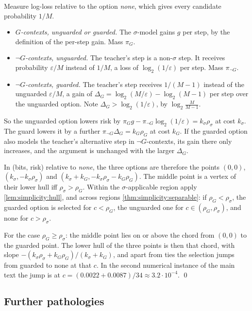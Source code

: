 Measure log-loss relative to the option \emph{none}, which gives every candidate probability $1/M$.
\begin{itemize}
\item \emph{$G$-contexts, unguarded or guarded.} The $\sigma$-model gains $g$ per step, by the definition of the per-step gain. Mass $\pi_G$.
\item \emph{$\neg G$-contexts, unguarded.} The teacher's step is a non-$\sigma$ step. It receives probability $\varepsilon/M$ instead of $1/M$, a loss of $\log_2(1/\varepsilon)$ per step. Mass $\pi_{\neg G}$.
\item \emph{$\neg G$-contexts, guarded.} The teacher's step receives $1/(M-1)$ instead of the unguarded $\varepsilon/M$, a gain of $\Delta_G=\log_2(M/\varepsilon)-\log_2(M-1)$ per step over the unguarded option. Note $\Delta_G>\log_2(1/\varepsilon)$, by $\log_2\frac M{M-1}$.
\end{itemize}
So the unguarded option lowers risk by $\pi_Gg-\pi_{\neg G}\log_2(1/\varepsilon)=k_\sigma\rho_\sigma$ at cost $k_\sigma$. The guard lowers it by a further $\pi_{\neg G}\Delta_G=k_G\rho_G$ at cost $k_G$. If the guarded option also models the teacher's alternative step in $\neg G$-contexts, its gain there only increases, and the argument is unchanged with the larger $\Delta_G$.

In (bits, risk) relative to \emph{none}, the three options are therefore the points $(0,0)$, $(k_\sigma,-k_\sigma\rho_\sigma)$ and $(k_\sigma+k_G,-k_\sigma\rho_\sigma-k_G\rho_G)$. The middle point is a vertex of their lower hull iff $\rho_\sigma>\rho_G$. Within the $\sigma$-applicable region apply \cref{lem:simplicity:hull}, and across regions \cref{thm:simplicity:separable}: if $\rho_G<\rho_\sigma$, the guarded option is selected for $c<\rho_G$, the unguarded one for $c\in(\rho_G,\rho_\sigma)$, and none for $c>\rho_\sigma$.

For the case $\rho_G\ge\rho_\sigma$: the middle point lies on or above the chord from $(0,0)$ to the guarded point. The lower hull of the three points is then that chord, with slope $-(k_\sigma\rho_\sigma+k_G\rho_G)/(k_\sigma+k_G)$, and apart from ties the selection jumps from guarded to none at that $c$. In the second numerical instance of the main text the jump is at $c=(0.0022+0.0087)/34\approx3.2\cdot10^{-4}$.
\qed

\subsection{Further pathologies}\label{app:simplicity:further}

